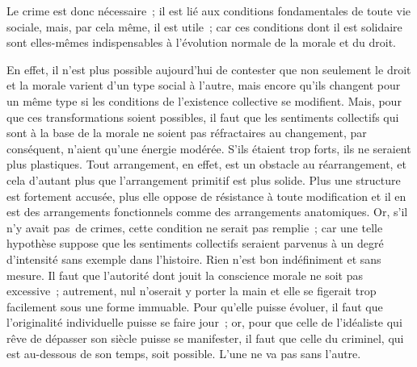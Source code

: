 \documentclass[french,twoside]{book} %
\begin{document}
Le crime est donc nécessaire ; il est lié aux conditions fondamentales de toute vie sociale, mais, par cela même, il est utile ; car ces conditions dont il est solidaire sont elles-mêmes indispensables à l’évolution normale de la morale et du droit.\par
En effet, il n’est plus possible aujourd’hui de contester que non seulement le droit et la morale varient d’un type social à l’autre, mais encore qu’ils changent pour un même type si les conditions de l’existence collective se modifient. Mais, pour que ces transformations soient possibles, il faut que les sentiments collectifs qui sont à la base de la morale ne soient pas réfractaires au changement, par conséquent, n’aient qu’une énergie modérée. S’ils étaient trop forts, ils ne seraient plus plastiques. Tout arrangement, en effet, est un obstacle au réarrangement, et cela d’autant plus que l’arrangement primitif est plus solide. Plus une structure est fortement accusée, plus elle oppose de résistance à toute modification et il en est des arrangements fonctionnels comme des arrangements anatomiques. Or, s’il n’y avait pas de crimes, cette condition ne serait pas remplie ; car une telle hypothèse suppose que les sentiments collectifs seraient parvenus à un degré d’intensité sans exemple dans l’histoire. Rien n’est bon indéfiniment et sans mesure. Il faut que l’autorité dont jouit la conscience morale ne soit pas excessive ; autrement, nul n’oserait y porter la main et elle se figerait trop facilement sous une forme immuable. Pour qu’elle puisse évoluer, il faut que l’originalité individuelle puisse se faire jour ; or, pour que celle de l’idéaliste qui rêve de dépasser son siècle puisse se manifester, il faut que celle du criminel, qui est au-dessous de son temps, soit possible. L’une ne va pas sans l’autre.\par
\end{document}
